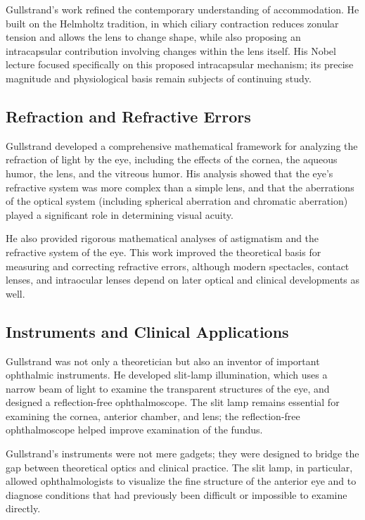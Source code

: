 Gullstrand's work refined the contemporary understanding of accommodation. He built on the Helmholtz tradition, in which ciliary contraction reduces zonular tension and allows the lens to change shape, while also proposing an intracapsular contribution involving changes within the lens itself. His Nobel lecture focused specifically on this proposed intracapsular mechanism; its precise magnitude and physiological basis remain subjects of continuing study.\cite{lecture-1911}

\subsection{Refraction and Refractive Errors}

Gullstrand developed a comprehensive mathematical framework for analyzing the refraction of light by the eye, including the effects of the cornea, the aqueous humor, the lens, and the vitreous humor. His analysis showed that the eye's refractive system was more complex than a simple lens, and that the aberrations of the optical system (including spherical aberration and chromatic aberration) played a significant role in determining visual acuity.

He also provided rigorous mathematical analyses of astigmatism and the refractive system of the eye. This work improved the theoretical basis for measuring and correcting refractive errors, although modern spectacles, contact lenses, and intraocular lenses depend on later optical and clinical developments as well.

\subsection{Instruments and Clinical Applications}

Gullstrand was not only a theoretician but also an inventor of important ophthalmic instruments. He developed slit-lamp illumination, which uses a narrow beam of light to examine the transparent structures of the eye, and designed a reflection-free ophthalmoscope. The slit lamp remains essential for examining the cornea, anterior chamber, and lens; the reflection-free ophthalmoscope helped improve examination of the fundus.\cite{gullstrand-biographical,gullstrand-history}

Gullstrand's instruments were not mere gadgets; they were designed to bridge the gap between theoretical optics and clinical practice. The slit lamp, in particular, allowed ophthalmologists to visualize the fine structure of the anterior eye and to diagnose conditions that had previously been difficult or impossible to examine directly.

